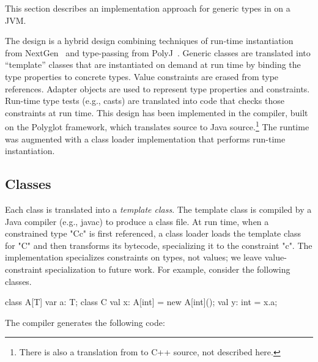 This section describes an implementation approach for
generic types in \Xten{} on a JVM.

The design is a hybrid design combining techniques of run-time
instantiation from
NextGen~\cite{nextgen,allen03,allen04} and type-passing from
PolyJ~\cite{java-popl97}.  Generic classes are translated
into ``template'' classes that are instantiated on demand at run time by
binding the type properties to concrete types.
%
Value constraints are erased from type references.
Adapter objects are used to represent type
properties and constraints.  
Run-time type tests (e.g., casts) are translated
into code that checks those constraints at run time.
%
This design has been implemented in the \Xten{} compiler, built
on the Polyglot framework, which
translates \Xten{} source to Java source.\footnote{There is also
a translation from \Xten{} to C++ source, not described here.}
The \Xten{} runtime was augmented with a class loader
implementation that performs run-time instantiation.

\subsection{Classes}
Each class is translated into a \emph{template class}.
The template class is compiled by a Java compiler (e.g., javac)
to produce a class file.
At run time, when a constrained type \xcd"C{c}" is first referenced, a
class loader loads the template class for \xcd"C" and then
transforms its bytecode, specializing it to the constraint
\xcd"c".  The implementation specializes constraints on
types, not values; we leave value-constraint specialization to
future work.
%
For example, consider the following classes.
{\footnotesize
\begin{xten}
class A[T] {
    var a: T;
}
class C {
    val x: A[int] = new A[int]();
    val y: int = x.a;
}
\end{xten}}

The compiler generates the following code:
{\footnotesize
{}}

